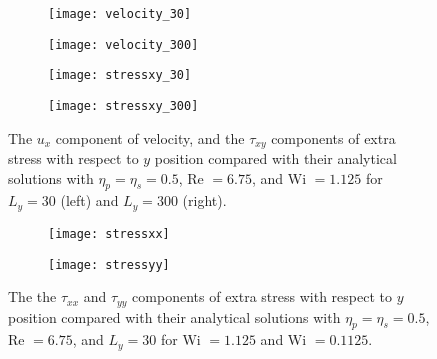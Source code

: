 \begin{figure}[htbp]
	\centering
\begin{subfigure}{0.5\linewidth}
	\texttt{[image: velocity\_30]}
	\label{fig:velocity_30}
\end{subfigure}\hfill
\begin{subfigure}{0.5\linewidth}
	\texttt{[image: velocity\_300]}
	\label{fig:velocity_300}
\end{subfigure}
\medskip

\begin{subfigure}{0.5\linewidth}
	\texttt{[image: stressxy\_30]}
	\label{fig:stressxy_30}
\end{subfigure}\hfill
\begin{subfigure}{0.5\linewidth}
	\texttt{[image: stressxy\_300]}
	\label{fig:stressxy_300}
\end{subfigure}
\caption{The $u_x$ component of velocity, and the $ \tau_{xy}$ components of extra stress with respect to $y$ position compared with their analytical solutions with $\eta_p = \eta_s = 0.5$, Re $= 6.75$, and Wi $= 1.125$ for $L_y = 30$ (left) and $L_y = 300$ (right).}
\label{fig:box_size_poiseuille}
\end{figure}

\begin{figure}
\begin{subfigure}{0.5\linewidth}
	\texttt{[image: stressxx]}
	\label{fig:stressxx}
\end{subfigure}\hfill
\begin{subfigure}{0.5\linewidth}
	\texttt{[image: stressyy]}
	\label{fig:stressyy}
\end{subfigure}
\caption{The the $ \tau_{xx}$ and $\tau_{yy}$ components of extra stress with respect to $y$ position compared with their analytical solutions with $\eta_p = \eta_s = 0.5$, Re $= 6.75$, and $L_y = 30$ for Wi $= 1.125$ and Wi $=0.1125$.}
\label{fig:diagonal_stress_poiseuille}
\end{figure}


